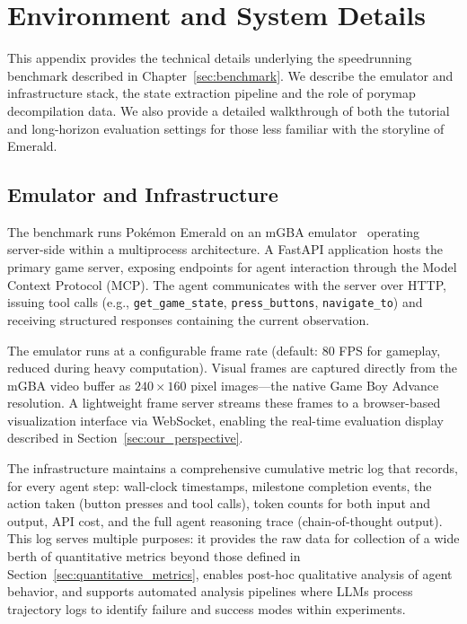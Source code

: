
\appendix


\section{Environment and System Details}\label{sec:appendix_environment}

This appendix provides the technical details underlying the speedrunning benchmark described in Chapter~\ref{sec:benchmark}. We describe the emulator and infrastructure stack, the state extraction pipeline and the role of porymap decompilation data. We also provide a detailed walkthrough of both the tutorial and long-horizon evaluation settings for those less familiar with the storyline of \pokemon{} Emerald.

\subsection{Emulator and Infrastructure}\label{sec:appendix_infrastructure}

The benchmark runs Pok\'{e}mon Emerald on an mGBA emulator~\citep{huderlem2025porymap} operating server-side within a multiprocess architecture. A FastAPI application hosts the primary game server, exposing endpoints for agent interaction through the Model Context Protocol (MCP). The agent communicates with the server over HTTP, issuing tool calls (e.g., \texttt{get\_game\_state}, \texttt{press\_buttons}, \texttt{navigate\_to}) and receiving structured responses containing the current observation.

The emulator runs at a configurable frame rate (default: 80 FPS for gameplay, reduced during heavy computation). Visual frames are captured directly from the mGBA video buffer as $240 \times 160$ pixel images---the native Game Boy Advance resolution. A lightweight frame server streams these frames to a browser-based visualization interface via WebSocket, enabling the real-time evaluation display described in Section~\ref{sec:our_perspective}.

The infrastructure maintains a comprehensive cumulative metric log that records, for every agent step: wall-clock timestamps, milestone completion events, the action taken (button presses and tool calls), token counts for both input and output, API cost, and the full agent reasoning trace (chain-of-thought output). This log serves multiple purposes: it provides the raw data for collection of a wide berth of quantitative metrics beyond those defined in Section~\ref{sec:quantitative_metrics}, enables post-hoc qualitative analysis of agent behavior, and supports automated analysis pipelines where LLMs process trajectory logs to identify failure and success modes within experiments.

